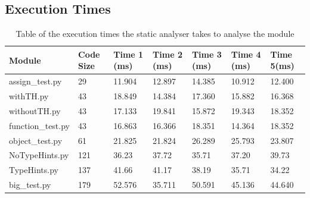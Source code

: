 \documentclass{l4proj}
\begin{document}
\begin{appendices}
\section{Execution Times}
\begin{table}[h]
\begin{tabular}{|l|l|l|l|l|l|l|}
\hline
Module            & Code Size & Time 1 (ms) & Time 2 (ms) & Time 3 (ms) & Time 4 (ms) & Time 5(ms) \\ \hline
assign\_test.py   & 29        & 11.904      & 12.897      & 14.385      & 10.912      & 12.400     \\ \hline
withTH.py         & 43        & 18.849      & 14.384      & 17.360      & 15.882      & 16.368     \\ \hline
withoutTH.py      & 43        & 17.133      & 19.841      & 15.872      & 19.343      & 18.352     \\ \hline
function\_test.py & 43        & 16.863      & 16.366      & 18.351      & 14.364      & 18.352     \\ \hline
object\_test.py   & 61        & 21.825      & 21.824      & 26.289      & 25.793      & 23.807     \\ \hline
NoTypeHints.py    & 121       & 36.23       & 37.72       & 35.71       & 37.20       & 39.73      \\ \hline
TypeHints.py      & 137       & 41.66       & 41.17       & 38.19       & 35.71       & 34.22      \\ \hline
big\_test.py      & 179       & 52.576      & 35.711      & 50.591      & 45.136      & 44.640     \\ \hline
\end{tabular}
\caption{Table of the execution times the static analyser takes to analyse the module}
\label{tab:exe1}
\end{table}
\end{appendices}





\end{document}
